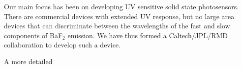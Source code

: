 Our main focus has been on developing UV sensitive solid state photosensors. There are commercial devices with extended UV response, but no large area devices that can discriminate between the wavelengths of the fast and slow components of BaF$_2$ emission. We have thus formed a Caltech/JPL/RMD collaboration to develop such a device.

A more detailed

